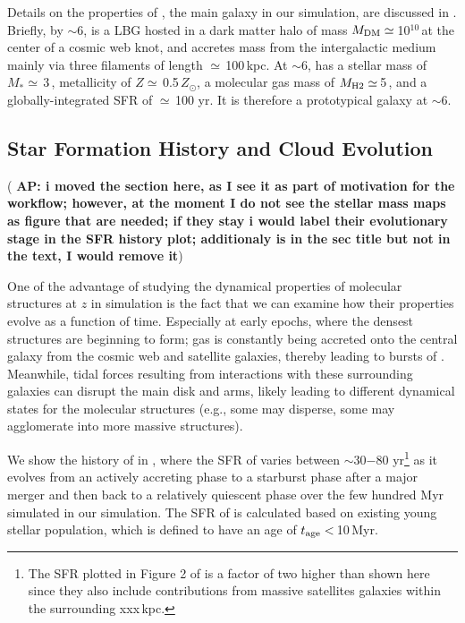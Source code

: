 \documentclass[apj]{emulateapj} %
\newcommand{\AP}[1]{({\bf \color{apcolor} AP: #1})}
\begin{document}
Details on the properties of \flower, the main galaxy in our simulation, are discussed in \citet{Pallottini17b}.
%
Briefly, by \z$\sim$6, \flower is a LBG hosted in a dark matter halo of mass $M_{\rm DM}\simeq$\,10$^{10}$\,\Msun at the center of a cosmic web knot, and accretes mass from the intergalactic medium mainly via three filaments of length $\simeq$\,100\,kpc. At \z$\sim$6, \flower has a stellar mass of $M_*\simeq$\,3\,\Msun, metallicity of $Z\simeq$\,0.5\,$Z_{\odot}$, a molecular gas mass of $M_{\rm H2}\simeq$\,5\,\Msun, and a globally-integrated SFR of $\simeq$\,100\,\Msun\,yr\pmOne. It is therefore a prototypical galaxy at \z$\sim$6.


\subsection{Star Formation History and Cloud Evolution} \label{sec:sfh}

\AP{i moved the section here, as I see it as part of motivation for the workflow; however, at the moment I do not see the stellar mass maps as figure that are needed; if they stay i would label their evolutionary stage in the SFR history plot; additionaly \quotes{cloud evolutiion} is in the sec title but not in the text, I would remove it}

One of the advantage of studying the dynamical properties of molecular structures at 
$z$ in simulation is the fact that we can examine how their properties evolve 
as a function of time. 
Especially at early epochs, where the densest structures are beginning to form; 
gas is constantly being accreted onto the central galaxy from the cosmic web and 
satellite galaxies, thereby leading to bursts of \SF.
Meanwhile, tidal forces resulting from interactions with these surrounding 
galaxies can disrupt the main disk and arms, likely leading to different dynamical states 
for the molecular structures (e.g., some may disperse, some may agglomerate into more massive 
structures). %

We show the \SF history of \flower in , where 
the SFR of \flower varies between $\sim$30$-$80\,\Msun\,yr\pmOne\footnote{
The SFR plotted in Figure 2 of \citet{Pallottini17b}
is a factor of two higher than shown here since they also include contributions from 
massive satellites galaxies within the surrounding xxx\,kpc.}
as it evolves from an actively accreting phase to 
a starburst phase after a major merger and then back to a relatively quiescent phase
over the few hundred Myr simulated in our simulation.
The SFR of \flower is calculated based on existing young stellar population, which is 
defined to have an age of $t_{\rm age}<$\,10\,Myr.
\end{document}
